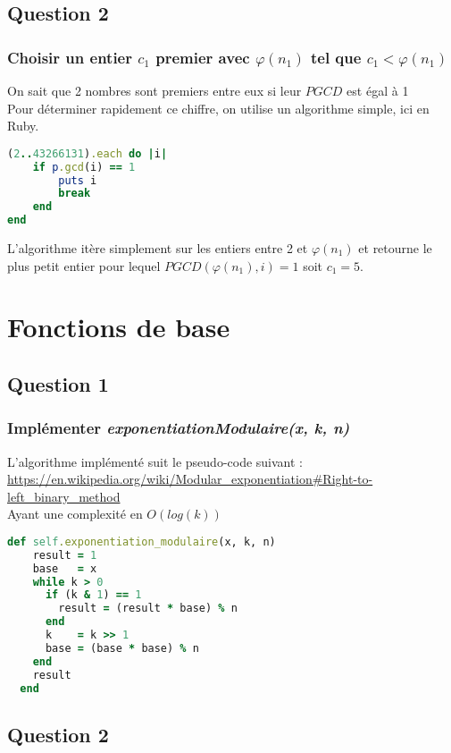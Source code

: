 \documentclass[a4paper,10pt]{article}
\begin{document}
\subsection{Question 2}
\subsubsection{Choisir un entier $c_1$ premier avec $\varphi(n_1)$ tel que $c_1 < \varphi(n_1)$}
On sait que 2 nombres sont premiers entre eux si leur $PGCD$ est égal à 1\\
Pour déterminer rapidement ce chiffre, on utilise un algorithme simple, ici en Ruby.\\
\begin{lstlisting}[language=Ruby]
(2..43266131).each do |i|
	if p.gcd(i) == 1
		puts i
		break
	end
end
\end{lstlisting}
L'algorithme itère simplement sur les entiers entre 2 et $\varphi(n_1)$ et retourne le plus petit entier pour lequel $PGCD(\varphi(n_1), i) = 1$ soit $c_1 = 5$.

\clearpage
\section{Fonctions de base}
\subsection{Question 1}
\subsubsection{Implémenter \textit{exponentiationModulaire(x, k, n)}}
L'algorithme implémenté suit le pseudo-code suivant :\\
 \url{https://en.wikipedia.org/wiki/Modular_exponentiation#Right-to-left_binary_method}\\
 Ayant une complexité en $O(log(k))$
\begin{lstlisting}[language=Ruby]
  def self.exponentiation_modulaire(x, k, n)
    result = 1
    base   = x
    while k > 0
      if (k & 1) == 1
        result = (result * base) % n
      end
      k    = k >> 1
      base = (base * base) % n
    end
    result
  end
\end{lstlisting}

\subsection{Question 2}
\end{document}

